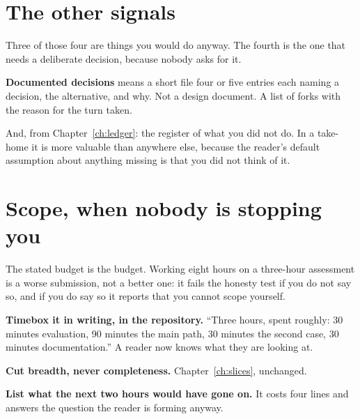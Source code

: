 
\section{The other signals}


Three of those four are things you would do anyway. The fourth is the one that
needs a deliberate decision, because nobody asks for it.

\textbf{Documented decisions} means a short file \dash{} four or five entries
\dash{} each naming a decision, the alternative, and why. Not a design
document. A list of forks with the reason for the turn taken.

And, from Chapter~\ref{ch:ledger}: the register of what you did not do. In a
take-home it is more valuable than anywhere else, because the reader's default
assumption about anything missing is that you did not think of it.

\section{Scope, when nobody is stopping you}

The stated budget is the budget. Working eight hours on a three-hour assessment
is a worse submission, not a better one: it fails the honesty test if you do not
say so, and if you do say so it reports that you cannot scope yourself.

\begin{kitmethod}
\textbf{Timebox it in writing, in the repository.} ``Three hours, spent
roughly: 30 minutes evaluation, 90 minutes the main path, 30 minutes the second
case, 30 minutes documentation.'' A reader now knows what they are looking at.

\textbf{Cut breadth, never completeness.} Chapter~\ref{ch:slices}, unchanged.

\textbf{List what the next two hours would have gone on.} It costs four lines
and answers the question the reader is forming anyway.
\end{kitmethod}

